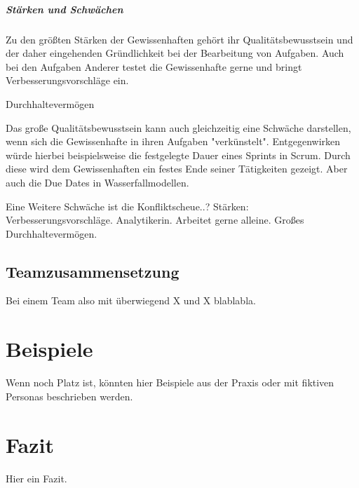 \documentclass[twocolumn,10pt]{asme2ej}
\begin{document}
\subparagraph{Stärken und Schwächen}
Zu den größten Stärken der Gewissenhaften gehört ihr Qualitätsbewusstsein und der daher eingehenden Gründlichkeit bei der Bearbeitung von Aufgaben. Auch bei den Aufgaben Anderer testet die Gewissenhafte gerne und bringt Verbesserungsvorschläge ein. 

Durchhaltevermögen

Das große Qualitätsbewusstsein kann auch gleichzeitig eine Schwäche darstellen, wenn sich die Gewissenhafte in ihren Aufgaben "verkünstelt". Entgegenwirken würde hierbei beispielsweise die festgelegte Dauer eines Sprints in Scrum. Durch diese wird dem Gewissenhaften ein festes Ende seiner Tätigkeiten gezeigt. Aber auch die Due Dates in Wasserfallmodellen.

Eine Weitere Schwäche ist die Konfliktscheue..?
Stärken: Verbesserungsvorschläge. Analytikerin. Arbeitet gerne alleine. Großes Durchhaltevermögen.

\cite{disc_pm}
\subsection{Teamzusammensetzung}
Bei einem Team also mit überwiegend X und X blablabla.

\section{Beispiele}
Wenn noch Platz ist, könnten hier Beispiele aus der Praxis oder mit fiktiven Personas beschrieben werden.

\section{Fazit}
Hier ein Fazit.




\end{document}
